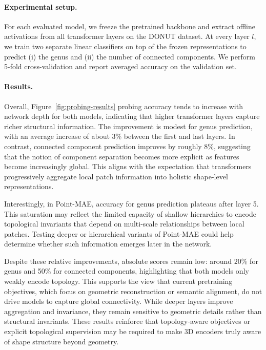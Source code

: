 \paragraph{Experimental setup.}
For each evaluated model, we freeze the pretrained backbone and extract offline activations from all transformer layers on the DONUT dataset. At every layer $l$, we train two separate linear classifiers on top of the frozen representations to predict (i) the genus and (ii) the number of connected components. We perform 5-fold cross-validation and report averaged accuracy on the validation set.

\paragraph{Results.}
Overall, Figure~\ref{fig:probing-results} probing accuracy tends to increase with network depth for both models, indicating that higher transformer layers capture richer structural information. The improvement is modest for genus prediction, with an average increase of about 3\% between the first and last layers. In contrast, connected component prediction improves by roughly 8\%, suggesting that the notion of component separation becomes more explicit as features become increasingly global. This aligns with the expectation that transformers progressively aggregate local patch information into holistic shape-level representations.

Interestingly, in Point-MAE, accuracy for genus prediction plateaus after layer 5. This saturation may reflect the limited capacity of shallow hierarchies to encode topological invariants that depend on multi-scale relationships between local patches. Testing deeper or hierarchical variants of Point-MAE could help determine whether such information emerges later in the network.

Despite these relative improvements, absolute scores remain low: around 20\% for genus and 50\% for connected components, highlighting that both models only weakly encode topology. This supports the view that current pretraining objectives, which focus on geometric reconstruction or semantic alignment, do not drive models to capture global connectivity. While deeper layers improve aggregation and invariance, they remain sensitive to geometric details rather than structural invariants. These results reinforce that topology-aware objectives or explicit topological supervision may be required to make 3D encoders truly aware of shape structure beyond geometry.

